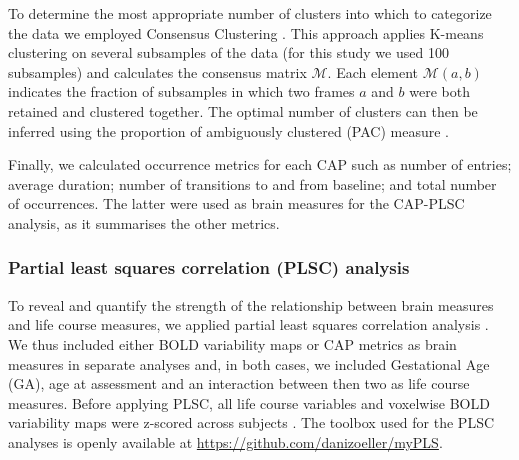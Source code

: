 To determine the most appropriate number of clusters into which to categorize the data we employed Consensus Clustering \citep{Monti2003}. This approach applies K-means clustering on several subsamples of the data (for this study we used 100 subsamples) and calculates the consensus matrix $\mathcal{M}$. Each element $\mathcal{M}(a,b)$ indicates the fraction of subsamples in which two frames $a$ and $b$ were both retained and clustered together. The optimal number of clusters can then be inferred using the proportion of ambiguously  clustered (PAC) measure \citep{Senbabaoglu2014}. 

Finally, we calculated occurrence metrics for each CAP such as number of entries; average duration; number of transitions to and from baseline; and total number of occurrences. The latter were used as brain measures for the CAP-PLSC analysis, as it summarises the other metrics.



\subsubsection{Partial least squares correlation (PLSC) analysis}

 To reveal and quantify the strength of the relationship between brain measures and life course measures, we applied partial least squares correlation analysis \citep{McIntosh2004, Krishnan2011}. We thus included either BOLD variability maps or CAP metrics as brain measures in separate analyses and, in both cases, we included Gestational Age (GA), age at assessment and an interaction between then two as life course measures. Before applying PLSC, all life course variables and voxelwise BOLD variability maps were z-scored across subjects \citep{Krishnan2011}. The toolbox used for the PLSC analyses is openly available at \href{https://github.com/danizoeller/myPLS}{https://github.com/danizoeller/myPLS}.


